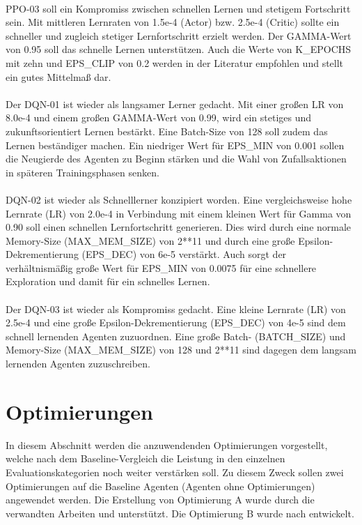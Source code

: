 \\PPO-03 soll ein Kompromiss zwischen schnellen Lernen und stetigem Fortschritt sein. Mit mittleren Lernraten von 1.5e-4 (Actor) bzw. 2.5e-4 (Critic) sollte ein schneller und zugleich stetiger Lernfortschritt erzielt werden. Der GAMMA-Wert von 0.95 soll das schnelle Lernen unterstützen. Auch die Werte von K\_EPOCHS mit zehn und EPS\_CLIP von 0.2 werden in der Literatur \cite[Anhang A]{PPO} empfohlen und stellt ein gutes Mittelmaß dar.\\
\\Der DQN-01 ist wieder als langsamer Lerner gedacht. Mit einer großen LR von 8.0e-4 und einem großen GAMMA-Wert von 0.99, wird ein stetiges und zukunftsorientiert Lernen bestärkt. Eine Batch-Size von 128 soll zudem das Lernen beständiger machen. Ein niedriger Wert für EPS\_MIN von 0.001 sollen die Neugierde des Agenten zu Beginn stärken und die Wahl von Zufallsaktionen in späteren Trainingsphasen senken.\\
\\DQN-02 ist wieder als Schnelllerner konzipiert worden. Eine vergleichsweise hohe Lernrate (LR) von 2.0e-4 in Verbindung mit einem kleinen Wert für Gamma von 0.90 soll einen schnellen Lernfortschritt generieren. Dies wird durch eine normale Memory-Size (MAX\_MEM\_SIZE) von 2**11 und durch eine große Epsilon-Dekrementierung (EPS\_DEC) von 6e-5 verstärkt. Auch sorgt der verhältnismäßig große Wert für EPS\_MIN von 0.0075 für eine schnellere Exploration und damit für ein schnelles Lernen.\\
\\Der DQN-03 ist wieder als Kompromiss gedacht. Eine kleine Lernrate (LR) von 2.5e-4 und eine große Epsilon-Dekrementierung (EPS\_DEC) von 4e-5 sind dem schnell lernenden Agenten zuzuordnen. Eine große Batch- (BATCH\_SIZE) und Memory-Size (MAX\_MEM\_SIZE) von 128 und 2**11 sind dagegen dem langsam lernenden Agenten zuzuschreiben.

\section{Optimierungen} \label{sec:Konzept_Optimierungen}
In diesem Abschnitt werden die anzuwendenden Optimierungen vorgestellt, welche nach dem Baseline-Vergleich die Leistung in den einzelnen Evaluationskategorien noch weiter verstärken soll. Zu diesem Zweck sollen zwei Optimierungen auf die Baseline Agenten (Agenten ohne Optimierungen) angewendet werden. Die Erstellung von Optimierung A wurde durch die verwandten Arbeiten \cite{UAV} und \cite{Autonomous_Agents_in_Snake_Game_via_DRL} unterstützt. Die Optimierung B wurde nach \cite[S. 331 f.]{DRL_Lapan} entwickelt.\\

